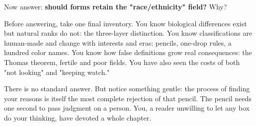 Now answer: \textbf{should forms retain the "race/ethnicity" field?} Why?

Before answering, take one final inventory. You know biological differences exist but natural ranks do not: the three-layer distinction. You know classifications are human-made and change with interests and eras: pencils, one-drop rules, a hundred color names. You know how false definitions grow real consequences: the Thomas theorem, fertile and poor fields. You have also seen the costs of both "not looking" and "keeping watch."

There is no standard answer. But notice something gentle: the process of finding your reasons is itself the most complete rejection of that pencil. The pencil needs one second to pass judgment on a person. You, a reader unwilling to let any box do your thinking, have devoted a whole chapter.
